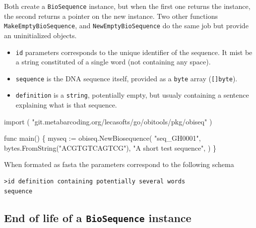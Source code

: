 \documentclass[
  letterpaper,
  DIV=11,
  numbers=noendperiod]{scrreprt}
\newenvironment{Shaded}{\begin{snugshade}}{\end{snugshade}}
\newcommand{\KeywordTok}[1]{\textcolor[rgb]{0.00,0.23,0.31}{#1}}
\newcommand{\NormalTok}[1]{\textcolor[rgb]{0.00,0.23,0.31}{#1}}
\newcommand{\OperatorTok}[1]{\textcolor[rgb]{0.37,0.37,0.37}{#1}}
\newcommand{\StringTok}[1]{\textcolor[rgb]{0.13,0.47,0.30}{#1}}
\providecommand{\tightlist}{%
  \setlength{\itemsep}{0pt}\setlength{\parskip}{0pt}}\usepackage{longtable,booktabs,array}
\begin{document}
Both create a \texttt{BioSequence} instance, but when the first one
returns the instance, the second returns a pointer on the new instance.
Two other functions \texttt{MakeEmptyBioSequence}, and
\texttt{NewEmptyBioSequence} do the same job but provide an
uninitialized objects.

\begin{itemize}
\tightlist
\item
  \texttt{id} parameters corresponds to the unique identifier of the
  sequence. It mist be a string constituted of a single word (not
  containing any space).
\item
  \texttt{sequence} is the DNA sequence itself, provided as a
  \texttt{byte} array (\texttt{{[}{]}byte}).
\item
  \texttt{definition} is a \texttt{string}, potentially empty, but
  usualy containing a sentence explaining what is that sequence.
\end{itemize}

\begin{Shaded}
\begin{Highlighting}[]
\KeywordTok{import} \OperatorTok{(}
    \StringTok{"git.metabarcoding.org/lecasofts/go/obitools/pkg/obiseq"}
\OperatorTok{)}

\KeywordTok{func}\NormalTok{ main}\OperatorTok{()} \OperatorTok{\{}
\NormalTok{    myseq }\OperatorTok{:=}\NormalTok{ obiseq}\OperatorTok{.}\NormalTok{NewBiosequence}\OperatorTok{(}
        \StringTok{"seq\_GH0001"}\OperatorTok{,}
\NormalTok{        bytes}\OperatorTok{.}\NormalTok{FromString}\OperatorTok{(}\StringTok{"ACGTGTCAGTCG"}\OperatorTok{),}
        \StringTok{"A short test sequence"}\OperatorTok{,}
        \OperatorTok{)}
\OperatorTok{\}}
\end{Highlighting}
\end{Shaded}

When formated as fasta the parameters correspond to the following schema

\begin{verbatim}
>id definition containing potentially several words
sequence
\end{verbatim}

\hypertarget{end-of-life-of-a-biosequence-instance}{%
\subsection*{\texorpdfstring{End of life of a \texttt{BioSequence}
instance}{End of life of a BioSequence instance}}\label{end-of-life-of-a-biosequence-instance}}
\end{document}
